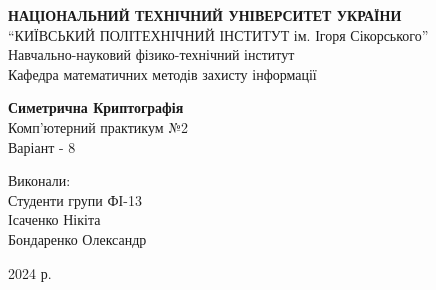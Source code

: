 \pagestyle{empty}

\begin{titlepage}
    \begin{center}

        \textbf{НАЦІОНАЛЬНИЙ ТЕХНІЧНИЙ УНІВЕРСИТЕТ УКРАЇНИ}\\
        “КИЇВСЬКИЙ ПОЛІТЕХНІЧНИЙ ІНСТИТУТ ім. Ігоря Сікорського”\\
        Навчально-науковий фізико-технічний інститут\\
        Кафедра математичних методів захисту інформації

        \vspace{6cm}

        \Large \textbf{Симетрична Криптографія}\\
        Комп'ютерний практикум №2\\
        Варіант - 8

    \end{center}

    \vspace{9cm}
    \begin{flushright}
        Виконали:\\
        Студенти групи ФІ-13\\
        Ісаченко Нікіта\\
        Бондаренко Олександр
    \end{flushright}

    \vspace*{3cm}

    \begin{center}
        2024 р.
    \end{center}
\end{titlepage}